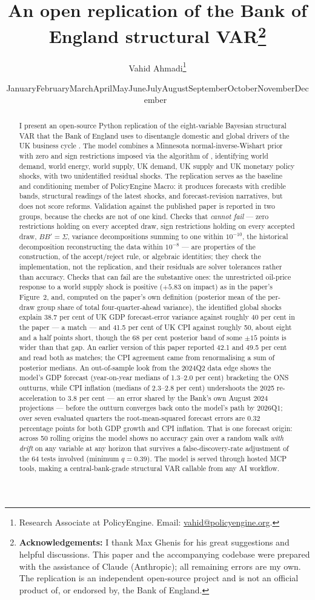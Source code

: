 \documentclass[11pt]{article}
\title{\bfseries An open replication of the Bank of England structural VAR\thanks{\textbf{Acknowledgements:} I thank Max Ghenis for his great suggestions and helpful discussions. This paper and the accompanying codebase were prepared with the assistance of Claude (Anthropic); all remaining errors are my own. The replication is an independent open-source project and is not an official product of, or endorsed by, the Bank of England.}\\[0.7cm]}
\author{Vahid Ahmadi\thanks{Research Associate at PolicyEngine. Email: \href{mailto:vahid@policyengine.org}{vahid@policyengine.org}.}}
\date{\small \ifcase\month\or January\or February\or March\or April\or May\or June\or July\or August\or September\or October\or November\or December\fi\ \the\year}
\begin{document}
\maketitle

\begin{abstract}
\noindent I present an open-source Python replication of the eight-variable Bayesian structural VAR that the Bank of England uses to disentangle domestic and global drivers of the UK business cycle \citep{brignone2025}. The model combines a Minnesota normal-inverse-Wishart prior with zero and sign restrictions imposed via the algorithm of \citet{arias2018}, identifying world demand, world energy, world supply, UK demand, UK supply and UK monetary policy shocks, with two unidentified residual shocks. The replication serves as the baseline and conditioning member of PolicyEngine Macro: it produces forecasts with credible bands, structural readings of the latest shocks, and forecast-revision narratives, but does not score reforms. Validation against the published paper is reported in two groups, because the checks are not of one kind. Checks that \emph{cannot fail} --- zero restrictions holding on every accepted draw, sign restrictions holding on every accepted draw, $BB'=\Sigma$, variance decompositions summing to one within $10^{-10}$, the historical decomposition reconstructing the data within $10^{-8}$ --- are properties of the \citet{arias2018} construction, of the accept/reject rule, or algebraic identities; they check the implementation, not the replication, and their residuals are solver tolerances rather than accuracy. Checks that can fail are the substantive ones: the unrestricted oil-price response to a world supply shock is positive ($+5.83$ on impact) as in the paper's Figure~2, and, computed on the paper's own definition (posterior mean of the per-draw group share of total four-quarter-ahead variance), the identified global shocks explain 38.7 per cent of UK GDP forecast-error variance against roughly 40 per cent in the paper --- a match --- and 41.5 per cent of UK CPI against roughly 50, about eight and a half points short, though the 68 per cent posterior band of some $\pm15$ points is wider than that gap. An earlier version of this paper reported 42.1 and 49.5 per cent and read both as matches; the CPI agreement came from renormalising a sum of posterior medians. An out-of-sample look from the 2024Q2 data edge shows the model's GDP forecast (year-on-year medians of 1.3--2.0 per cent) bracketing the ONS outturns, while CPI inflation (medians of 2.3--2.8 per cent) undershoots the 2025 re-acceleration to 3.8 per cent --- an error shared by the Bank's own August 2024 projections --- before the outturn converges back onto the model's path by 2026Q1; over seven evaluated quarters the root-mean-squared forecast errors are 0.32 percentage points for both GDP growth and CPI inflation. That is one forecast origin: across 50 rolling origins the model shows no accuracy gain over a random walk \emph{with drift} on any variable at any horizon that survives a false-discovery-rate adjustment of the 64 tests involved (minimum $q = 0.39$). The model is served through hosted MCP tools, making a central-bank-grade structural VAR callable from any AI workflow.
\end{abstract}
\end{document}
